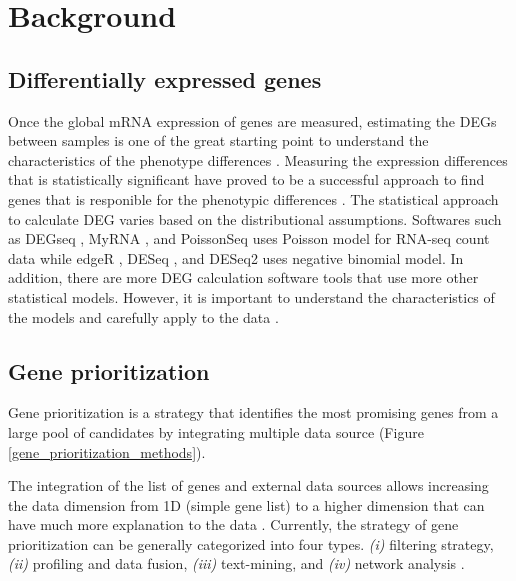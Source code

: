 \documentclass[oneside,phd]{snuthesis}
\begin{document}
\section{Background}
\subsection{Differentially expressed genes}

Once the global mRNA expression of genes are measured, estimating the DEGs between samples is one of the great starting point to understand the characteristics of the phenotype differences \citep{marioni2008rna}. 
Measuring the expression differences that is statistically significant have proved to be a successful approach to find genes that is responible for the phenotypic differences \citep{hardcastle2010bayseq, robinson2010edger, anders2012differential, trapnell2013differential,leng2013ebseq,li2013finding,tarazona2015data}.
The statistical approach to calculate DEG varies based on the distributional assumptions. Softwares such as DEGseq \citep{wang2009degseq}, MyRNA \citep{langmead2010cloud}, and PoissonSeq \citep{li2012normalization} uses Poisson model for RNA-seq count data while edgeR \citep{robinson2010edger}, DESeq \citep{anders2012differential}, and DESeq2 \citep{love2014moderated} uses negative binomial model. 
In addition, there are more DEG calculation software tools that use more other statistical models. However, it is important to understand the characteristics of the models and carefully apply to the data \citep{huang2015differential}.

\subsection{Gene prioritization}
Gene prioritization is a strategy that identifies the most promising genes from a large pool of candidates by integrating multiple data source (Figure \ref{gene_prioritization_methods}). 

The integration of the list of genes and external data sources allows increasing the data dimension from 1D (simple gene list) to a higher dimension that can have much more explanation to the data \citep{moreau2012computational, cowen2017network}.
Currently, the strategy of gene prioritization can be generally categorized into four types.
\textit{(i)} filtering strategy, \textit{(ii)} profiling and data fusion, \textit{(iii)} text-mining, and \textit{(iv)} network analysis \citep{moreau2012computational}. 
\end{document}
